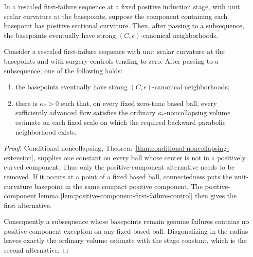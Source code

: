 \begin{lemma}
\label{lem:positive-component-first-failure-control}
\notready
In a rescaled first-failure sequence at a fixed positive induction stage,
with unit scalar curvature at the basepoints, suppose the component
containing each basepoint has positive sectional curvature.  Then, after
passing to a subsequence, the basepoints eventually have strong
$(C,\epsilon)$-canonical neighborhoods.
\end{lemma}

\begin{lemma}
\label{lem:first-failure-noncollapsing-bridge}
\notready
Consider a rescaled first-failure sequence with unit scalar curvature at the
basepoints and with surgery controls tending to zero.  After passing to a
subsequence, one of the following holds:
\begin{enumerate}
\item the basepoints eventually have strong
      $(C,\epsilon)$-canonical neighborhoods;
\item there is $\kappa_*>0$ such that, on every fixed zero-time based ball,
      every sufficiently advanced flow satisfies the ordinary
      $\kappa_*$-noncollapsing volume estimate on each fixed scale on which
      the required backward parabolic neighborhood exists.
\end{enumerate}
\end{lemma}

\begin{proof}
Conditional noncollapsing,
Theorem~\ref{thm:conditional-noncollapsing-extension}, supplies one constant
on every ball whose center is not in a positively curved component.  Thus
only the positive-component alternative needs to be removed.  If it occurs
at a point of a fixed based ball, connectedness puts the unit-curvature
basepoint in the same compact positive component.  The positive-component
lemma \ref{lem:positive-component-first-failure-control} then gives the
first alternative.

Consequently a subsequence whose basepoints remain genuine failures contains
no positive-component exception on any fixed based ball.  Diagonalizing in
the radius leaves exactly the ordinary volume estimate with the stage
constant, which is the second alternative.
\end{proof}

